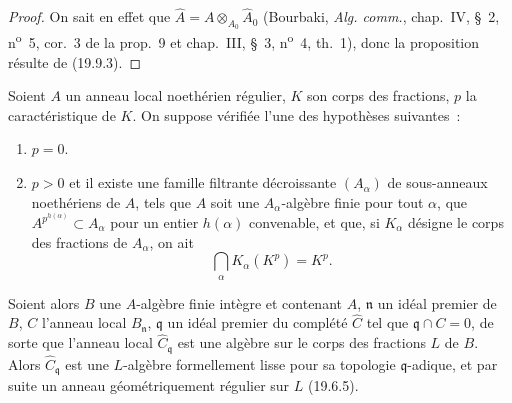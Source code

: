 \begin{proof}
On sait en effet que
$\widehat A=A\otimes_{A_0}\widehat A_0$ (Bourbaki,
\emph{Alg. comm.}, chap.~IV, §~2, n\textsuperscript{o}~5, cor.~3 de la
prop.~9 et chap.~III, §~3, n\textsuperscript{o}~4, th.~1), donc la proposition
résulte de (19.9.3).
\end{proof}

\begin{proposition}[22.3.2]
\label{0.22.3.2-fr}
Soient $A$ un anneau local noethérien régulier, $K$ son corps des fractions,
$p$ la caractéristique de $K$. On suppose vérifiée l'une des hypothèses
suivantes~:
\begin{enumerate}
  \item[(i)] $p=0$.
  \item[(ii)] $p>0$ et il existe une famille filtrante décroissante
  $(A_\alpha)$ de sous-anneaux noethériens de $A$, tels que $A$ soit une
  $A_\alpha$-algèbre finie pour tout $\alpha$, que
  $A^{p^{h(\alpha)}}\subset A_\alpha$ pour un entier $h(\alpha)$ convenable,
  et que, si $K_\alpha$ désigne le corps des fractions de $A_\alpha$, on ait
  \[
    \bigcap_\alpha K_\alpha(K^p)=K^p.
  \]
\end{enumerate}
Soient alors $B$ une $A$-algèbre finie intègre et contenant $A$,
$\mathfrak n$ un idéal premier de $B$, $C$ l'anneau local $B_\mathfrak n$,
$\mathfrak q$ un idéal premier du complété $\widehat C$ tel que
$\mathfrak q\cap C=0$, de sorte que l'anneau local
$\widehat C_\mathfrak q$ est une algèbre sur le corps des fractions $L$ de
$B$. Alors $\widehat C_\mathfrak q$ est une $L$-algèbre formellement lisse
pour sa topologie $\mathfrak q$-adique, et par suite un anneau
géométriquement régulier sur $L$ (19.6.5).
\end{proposition}

